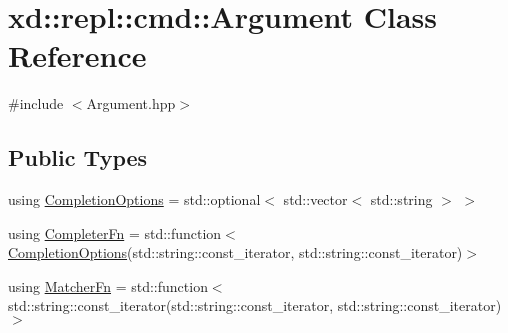 \hypertarget{classxd_1_1repl_1_1cmd_1_1_argument}{}\section{xd\+:\+:repl\+:\+:cmd\+:\+:Argument Class Reference}
\label{classxd_1_1repl_1_1cmd_1_1_argument}


{\ttfamily \#include $<$Argument.\+hpp$>$}

\subsection*{Public Types}
\begin{DoxyCompactItemize}
\item 
using \mbox{\hyperlink{classxd_1_1repl_1_1cmd_1_1_argument_a633ddaf50445b1f77d11d7e3bf0c4ea8}{Completion\+Options}} = std\+::optional$<$ std\+::vector$<$ std\+::string $>$ $>$
\item 
using \mbox{\hyperlink{classxd_1_1repl_1_1cmd_1_1_argument_ae3fcd7357ab584e17d2fb86c1f077fe9}{Completer\+Fn}} = std\+::function$<$ \mbox{\hyperlink{classxd_1_1repl_1_1cmd_1_1_argument_a633ddaf50445b1f77d11d7e3bf0c4ea8}{Completion\+Options}}(std\+::string\+::const\+\_\+iterator, std\+::string\+::const\+\_\+iterator)$>$
\item 
using \mbox{\hyperlink{classxd_1_1repl_1_1cmd_1_1_argument_a7284341abe139b035abfc7e1dca5d42e}{Matcher\+Fn}} = std\+::function$<$ std\+::string\+::const\+\_\+iterator(std\+::string\+::const\+\_\+iterator, std\+::string\+::const\+\_\+iterator)$>$
\end{DoxyCompactItemize}
